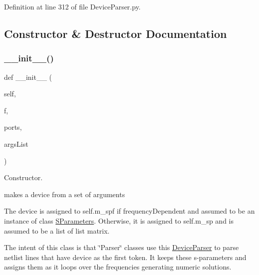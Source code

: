 Definition at line 312 of file Device\+Parser.\+py.



\subsection{Constructor \& Destructor Documentation}
\mbox{\label{classSignalIntegrity_1_1Parsers_1_1Devices_1_1DeviceParser_1_1DeviceParser_a286a7f15e5aa7761d219f91accd234c1}} 
\subsubsection{\texorpdfstring{\+\_\+\+\_\+init\+\_\+\+\_\+()}{\_\_init\_\_()}}
{\footnotesize\ttfamily def \+\_\+\+\_\+init\+\_\+\+\_\+ (\begin{DoxyParamCaption}\item[{}]{self,  }\item[{}]{f,  }\item[{}]{ports,  }\item[{}]{args\+List }\end{DoxyParamCaption})}



Constructor. 

makes a device from a set of arguments

The device is assigned to self.\+m\+\_\+spf if frequency\+Dependent and assumed to be an instance of class \hyperlink{namespaceSignalIntegrity_1_1SParameters}{S\+Parameters}. Otherwise, it is assigned to self.\+m\+\_\+sp and is assumed to be a list of list matrix.

The intent of this class is that \char`\"{}\+Parser\char`\"{} classes use this \hyperlink{classSignalIntegrity_1_1Parsers_1_1Devices_1_1DeviceParser_1_1DeviceParser}{Device\+Parser} to parse netlist lines that have \textquotesingle{}device\textquotesingle{} as the first token. It keeps these s-\/parameters and assigns them as it loops over the frequencies generating numeric solutions.


